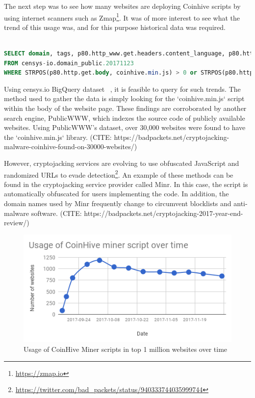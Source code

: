 The next step was to see how many websites are deploying Coinhive scripts by using internet scanners such as Zmap\footnote{\url{https://zmap.io}}. It was of more interest to see what the trend of this usage was, and for this purpose historical data was required. 

\begin{lstlisting}[caption={BigQuery SQL query to find websites using the Coinhive mining script using censys.io datasets},label={lst:bigquery},language=sql,linewidth=\linewidth]

SELECT domain, tags, p80.http_www.get.headers.content_language, p80.http_www.get.headers.server, p80.http.get.headers.x_powered_by, p80.http.get.title, p80.http_www.get.body as wwwbody, p80.http.get.body as plainbody 
FROM censys-io.domain_public.20171123
WHERE STRPOS(p80.http.get.body, coinhive.min.js) > 0 or STRPOS(p80.http_www.get.body, coinhive.min.js) >0)

\end{lstlisting}

Using censys.io BigQuery dataset ~\cite{censys15}, it is feasible to query for such trends. The method used to gather the data is simply looking for the `coinhive.min.js` script within the body of the website page. These findings are corroborated by another search engine, PublicWWW, which indexes the source code of publicly available websites. Using PublicWWW's dataset, over 30,000 websites were found to have the `coinhive.min.js` library. (CITE: https://badpackets.net/cryptojacking-malware-coinhive-found-on-30000-websites/)

However, cryptojacking services are evolving to use obfuscated JavaScript and randomized URLs to evade detection\footnote{\url{https://twitter.com/bad_packets/status/940333744035999744}}. An example of these methods can be found in the cryptojacking service provider called Minr. In this case, the script is automatically obfuscated for users implementing the code. In addition, the domain names used by Minr frequently change to circumvent blocklists and anti-malware software. (CITE: https://badpackets.net/cryptojacking-2017-year-end-review/)

\begin{figure}[t]
\centering
\includegraphics[width=\linewidth]{figures/usage_of_coinhive_over_time.png}
\caption{Usage of CoinHive Miner scripts in top 1 million websites over time}
\end{figure}


